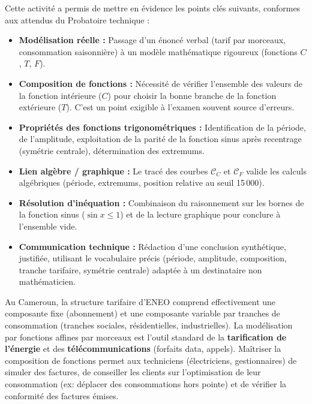 \documentclass[11pt]{article}
\newcommand{\cle}[1]{{\popxbold\color{popdark}#1}}
\newcounter{popsec}
\newcounter{popsub}
\newcommand{\courssub}[1]{%
  \stepcounter{popsub}%
  \par\vspace{9pt}\noindent{\popxbold\fontsize{11.5}{13}\selectfont\color{popink}{\color{poporange}\thepopsec.\thepopsub}\hspace{6pt}#1}\par\nopagebreak\vspace{4pt}
}
\begin{document}
\courssub{Bilan de l'activité}
Cette activité a permis de mettre en évidence les points clés suivants, conformes aux attendus du Probatoire technique :
\begin{itemize}
    \item \textbf{Modélisation réelle :} Passage d'un énoncé verbal (tarif par morceaux, consommation saisonnière) à un modèle mathématique rigoureux (fonctions $C$, $T$, $F$).
    \item \textbf{Composition de fonctions :} Nécessité de vérifier l'ensemble des valeurs de la fonction intérieure ($C$) pour choisir la bonne branche de la fonction extérieure ($T$). C'est un point \cle{exigible à l'examen} souvent source d'erreurs.
    \item \textbf{Propriétés des fonctions trigonométriques :} Identification de la période, de l'amplitude, exploitation de la parité de la fonction sinus après recentrage (symétrie centrale), détermination des extremums.
    \item \textbf{Lien algèbre / graphique :} Le tracé des courbes $\mathcal{C}_C$ et $\mathcal{C}_F$ valide les calculs algébriques (période, extremums, position relative au seuil 15\,000).
    \item \textbf{Résolution d'inéquation :} Combinaison du raisonnement sur les bornes de la fonction sinus ($\sin x \le 1$) et de la lecture graphique pour conclure à l'ensemble vide.
    \item \textbf{Communication technique :} Rédaction d'une conclusion synthétique, justifiée, utilisant le vocabulaire précis (période, amplitude, composition, tranche tarifaire, symétrie centrale) adaptée à un destinataire non mathématicien.
\end{itemize}
\begin{savaistu}
Au Cameroun, la structure tarifaire d'ENEO comprend effectivement une composante fixe (abonnement) et une composante variable par tranches de consommation (tranches sociales, résidentielles, industrielles). La modélisation par fonctions affines par morceaux est l'outil standard de la \textbf{tarification de l'énergie} et des \textbf{télécommunications} (forfaits data, appels). Maîtriser la composition de fonctions permet aux techniciens (électriciens, gestionnaires) de simuler des factures, de conseiller les clients sur l'optimisation de leur consommation (ex: déplacer des consommations hors pointe) et de vérifier la conformité des factures émises.
\end{savaistu}
\end{document}
